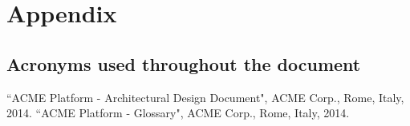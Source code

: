 \section{Appendix}

\subsection{Acronyms used throughout the document}
\begin{acronym}
\end{acronym}

\begin{thebibliography}{10}
 ``ACME Platform - Architectural Design Document", ACME Corp., Rome, Italy, 2014.
 ``ACME Platform - Glossary", ACME Corp., Rome, Italy, 2014.
\end{thebibliography}
